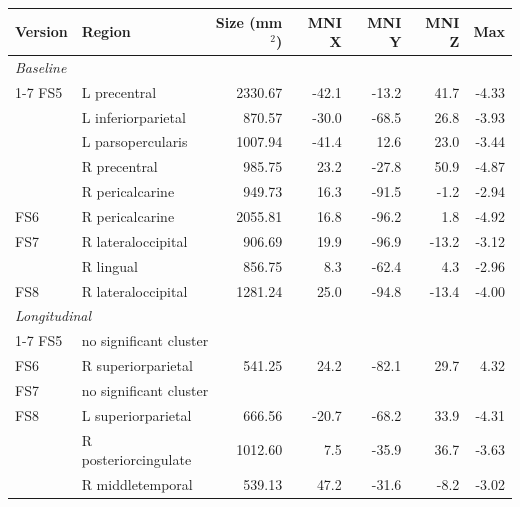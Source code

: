 \begin{tabular}{llrrrrr}
\toprule
Version & Region & Size (mm$^2$) & MNI X & MNI Y & MNI Z & Max \\
\midrule
\multicolumn{7}{l}{\textit{Baseline}} \\
\cmidrule(lr){1-7}
FS5 & L precentral & 2330.67 & -42.1 & -13.2 & 41.7 & -4.33 \\
 & L inferiorparietal & 870.57 & -30.0 & -68.5 & 26.8 & -3.93 \\
 & L parsopercularis & 1007.94 & -41.4 & 12.6 & 23.0 & -3.44 \\
 & R precentral & 985.75 & 23.2 & -27.8 & 50.9 & -4.87 \\
 & R pericalcarine & 949.73 & 16.3 & -91.5 & -1.2 & -2.94 \\
\rowcolor{gray!12}FS6 & R pericalcarine & 2055.81 & 16.8 & -96.2 & 1.8 & -4.92 \\
FS7 & R lateraloccipital & 906.69 & 19.9 & -96.9 & -13.2 & -3.12 \\
 & R lingual & 856.75 & 8.3 & -62.4 & 4.3 & -2.96 \\
\rowcolor{gray!12}FS8 & R lateraloccipital & 1281.24 & 25.0 & -94.8 & -13.4 & -4.00 \\
\multicolumn{7}{l}{\textit{Longitudinal}} \\
\cmidrule(lr){1-7}
FS5 & \multicolumn{6}{l}{no significant cluster} \\
\rowcolor{gray!12}FS6 & R superiorparietal & 541.25 & 24.2 & -82.1 & 29.7 & 4.32 \\
FS7 & \multicolumn{6}{l}{no significant cluster} \\
\rowcolor{gray!12}FS8 & L superiorparietal & 666.56 & -20.7 & -68.2 & 33.9 & -4.31 \\
\rowcolor{gray!12} & R posteriorcingulate & 1012.60 & 7.5 & -35.9 & 36.7 & -3.63 \\
\rowcolor{gray!12} & R middletemporal & 539.13 & 47.2 & -31.6 & -8.2 & -3.02 \\
\bottomrule
\end{tabular}
